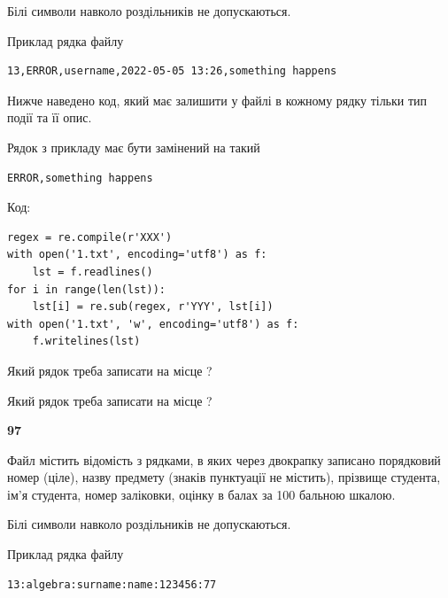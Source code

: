 Білі символи навколо роздільників не допускаються.

Приклад рядка файлу



\begin{verbatim}
13,ERROR,username,2022-05-05 13:26,something happens
\end{verbatim}


Нижче наведено код, який має залишити у файлі в кожному рядку тільки тип події та її опис.

Рядок з прикладу має бути замінений на такий



\begin{verbatim}
ERROR,something happens
\end{verbatim}




Код:



\begin{verbatim}
regex = re.compile(r'XXX')
with open('1.txt', encoding='utf8') as f:
    lst = f.readlines()
for i in range(len(lst)):
    lst[i] = re.sub(regex, r'YYY', lst[i])
with open('1.txt', 'w', encoding='utf8') as f:
    f.writelines(lst)
\end{verbatim}









Який рядок треба записати на місце  ?\par
\vspace{5mm}


Який рядок треба записати на місце  ?\par


\newpage

{\begin {center}\textbf{ 97}\end {center}}\par
Файл  містить відомість з рядками, в яких через двокрапку записано поряд\-ковий номер (ціле), назву предмету (знаків пунктуації не містить), прізвище студента, ім'я студента, номер заліковки, оцінку в балах за 100 бальною шкалою.

Білі символи навколо роздільників не допускаються.

Приклад рядка файлу



\begin{verbatim}
13:algebra:surname:name:123456:77
\end{verbatim}


